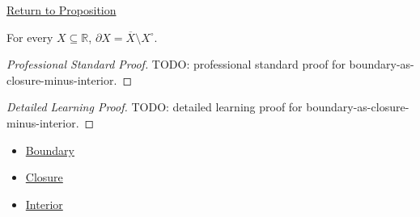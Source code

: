 \newpage
{}
\label{prf:boundary-as-closure-minus-interior}

\begin{remark*}[Return]
\hyperref[prop:boundary-as-closure-minus-interior]{Return to Proposition}
\end{remark*}

\begin{proposition*}
For every \(X\subseteq\mathbb{R}\), \(\partial X=\overline{X}\setminus X^\circ\).
\end{proposition*}

\begin{proof}[Professional Standard Proof]
\LRAProofBodyStart
TODO: professional standard proof for boundary-as-closure-minus-interior.
\end{proof}

\begin{proof}[Detailed Learning Proof]
\LRAProofBodyStart
TODO: detailed learning proof for boundary-as-closure-minus-interior.
\end{proof}

\begin{remark*}
\end{remark*}

\begin{dependencies}
\begin{itemize}
  \item \hyperref[def:boundary-r]{Boundary}
  \item \hyperref[def:closure-r]{Closure}
  \item \hyperref[def:interior-r]{Interior}
\end{itemize}
\end{dependencies}

\clearpage
